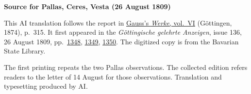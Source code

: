 \clearpage\thispagestyle{empty}
\begin{center}\textbf{Source for Pallas, Ceres, Vesta (26 August 1809)}\end{center}
\noindent This AI translation follows the report in \href{https://gdz.sub.uni-goettingen.de/id/PPN236007467}{Gauss’s \textit{Werke}, vol.~VI} (Göttingen, 1874), p.~315. It first appeared in the \textit{Göttingische gelehrte Anzeigen}, issue 136, 26 August 1809, pp.~\href{https://api.digitale-sammlungen.de/iiif/image/v2/bsb10538676_00340/full/1600,/0/default.jpg}{1348}, \href{https://api.digitale-sammlungen.de/iiif/image/v2/bsb10538676_00341/full/1600,/0/default.jpg}{1349}, \href{https://api.digitale-sammlungen.de/iiif/image/v2/bsb10538676_00342/full/1600,/0/default.jpg}{1350}. The digitized copy is from the Bavarian State Library.
\par\smallskip\noindent The first printing repeats the two Pallas observations. The collected edition refers readers to the letter of 14 August for those observations. Translation and typesetting produced by AI.
\clearpage
